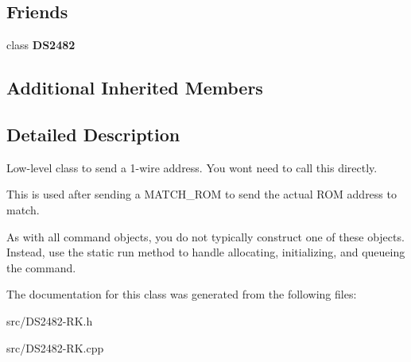 \subsection*{Friends}
\begin{DoxyCompactItemize}
\item 
\mbox{\label{class_d_s24821_wire_send_address_afeaf69274324e8dbeebede05c02d9c18}} 
class {\bfseries D\+S2482}
\end{DoxyCompactItemize}
\subsection*{Additional Inherited Members}


\subsection{Detailed Description}
Low-\/level class to send a 1-\/wire address. You won\textquotesingle{}t need to call this directly. 

This is used after sending a M\+A\+T\+C\+H\+\_\+\+R\+OM to send the actual R\+OM address to match.

As with all command objects, you do not typically construct one of these objects. Instead, use the static run method to handle allocating, initializing, and queueing the command. 

The documentation for this class was generated from the following files\+:\begin{DoxyCompactItemize}
\item 
src/D\+S2482-\/\+R\+K.\+h\item 
src/D\+S2482-\/\+R\+K.\+cpp\end{DoxyCompactItemize}
